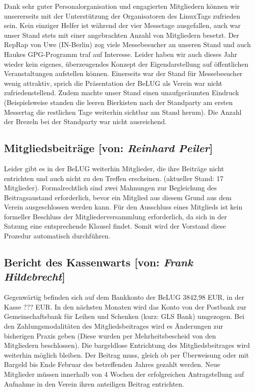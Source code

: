 \documentclass[11pt,a4paper,ngerman]{article}
\begin{document}
Dank sehr guter Personalorganisation und engagierten Mitgliedern können wir 
unsererseits mit der Unterstützung der Organisatoren des LinuxTags zufrieden 
sein. Kein einziger Helfer ist während der vier Messetage ausgefallen, auch war 
unser Stand stets mit einer angebrachten Anzahl von Mitgliedern besetzt. Der 
RepRap von Uwe (IN-Berlin) zog viele Messebesucher an unseren Stand und auch 
Haukes GPG-Programm traf auf Interesse. Leider haben wir auch dieses Jahr 
wieder kein eigenes, überzeugendes Konzept der Eigendarstellung auf 
öffentlichen Veranstaltungen aufstellen können. Einerseits war der Stand für 
Messebesucher wenig attraktiv, sprich die Präsentation der BeLUG als Verein war 
nicht zufriedenstellend. Zudem machte unser Stand einen unaufgeräumten Eindruck 
(Beispielsweise standen die leeren Bierkisten nach der Standparty am ersten 
Messertag die restlichen Tage weiterhin sichtbar am Stand herum). Die Anzahl 
der Brezeln bei der Standparty war nicht ausreichend.
  
  
  
  \subsection{Mitgliedsbeiträge [von: \textcolor{hellgrau.60}{\textsl{Reinhard 
              Peiler}}]}

Leider gibt es in der BeLUG weiterhin Mitglieder, die ihre Beiträge nicht 
entrichten und auch nicht zu den Treffen erscheinen. (aktueller Stand: 17 
Mitglieder). Formalrechtlich sind zwei Mahnungen zur Begleichung des 
Beitragsaustand erforderlich, bevor ein Mitglied aus diesem Grund aus dem 
Verein ausgeschlossen werden kann. Für den Ausschluss eines Mitglieds ist kein 
formeller Beschluss der Mitgliederversammlung erforderlich, da sich in der 
Satzung eine entsprechende Klausel findet. Somit wird der Vorstand diese 
Prozedur automatisch durchführen.


  \subsection{Bericht des Kassenwarts [von: 
\textcolor{hellgrau.60}{\textsl{Frank Hildebrecht}}]}

Gegenwärtig befinden sich auf dem Bankkonto der BeLUG 3842,98 EUR, in der Kasse 
??? EUR. In den nächsten Monaten wird das Konto von der Postbank zur 
Gemeinschaftsbank für Leihen und Schenken (kurz: GLS Bank) umgezogen. Bei den 
Zahlungsmodalitäten des Mitgliedsbeitrages wird es Änderungen zur 
bisherigen Praxis geben (Diese wurden per Mehrheitsbescheid von den Mitgliedern 
beschlossen). Die bargeldlose Entrichtung des Mitgliedsbeitrages wird weiterhin 
möglich bleiben. Der Beitrag muss, gleich ob per Überweisung oder mit Bargeld 
bis Ende Februar des betreffenden Jahres gezahlt werden. Neue Mitglieder müssen 
innerhalb von 4 Wochen der erfolgreichen Antragstellung auf Aufnahme in 
den Verein ihren anteiligen Beitrag entrichten.
\end{document}
